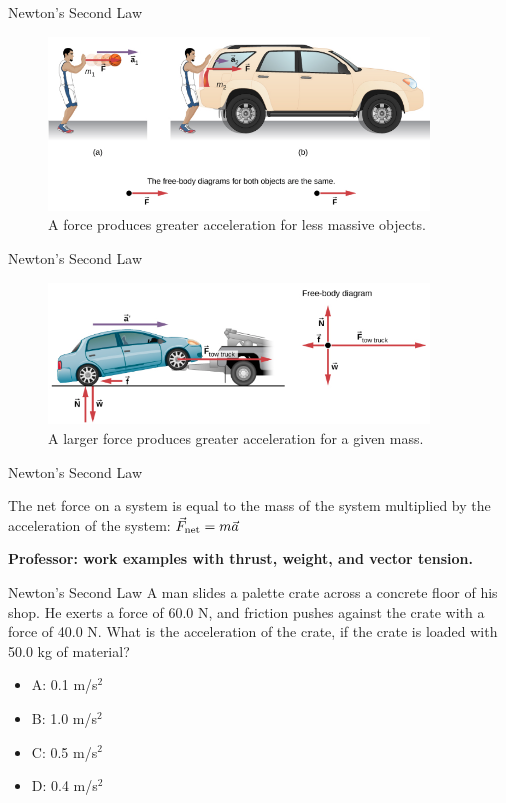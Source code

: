 \documentclass{beamer}
\begin{document}
\begin{frame}{Newton's Second Law}
\begin{figure}
\centering
\includegraphics[width=0.9\textwidth]{figures/NewtonsSecond.png}
\caption{\label{fig:newton1} A force produces greater acceleration for less massive objects.}
\end{figure}
\end{frame}

\begin{frame}{Newton's Second Law}
\begin{figure}
\centering
\includegraphics[width=0.9\textwidth]{figures/NewtonsSecond2.png}
\caption{\label{fig:newton2} A larger force produces greater acceleration for a given mass.}
\end{figure}
\end{frame}

\begin{frame}{Newton's Second Law}
\begin{tcolorbox}[colback=white,colframe=red!40!blue,title=Newton's Second Law]
\alert{The net force on a system is equal to the mass of the system multiplied by the acceleration of the system: $\vec{F}_{\rm net} = m \vec{a}$}
\end{tcolorbox}
\textbf{Professor: work examples with thrust, weight, and vector tension.} 
\end{frame}

\begin{frame}{Newton's Second Law}
A man slides a palette crate across a concrete floor of his shop.  He exerts a force of 60.0 N, and friction pushes against the crate with a force of 40.0 N.  What is the acceleration of the crate, if the crate is loaded with 50.0 kg of material?
\begin{itemize}
\item A: 0.1 m/s$^2$
\item B: 1.0 m/s$^2$
\item C: 0.5 m/s$^2$
\item D: 0.4 m/s$^2$
\end{itemize}
\end{frame}
\end{document}
